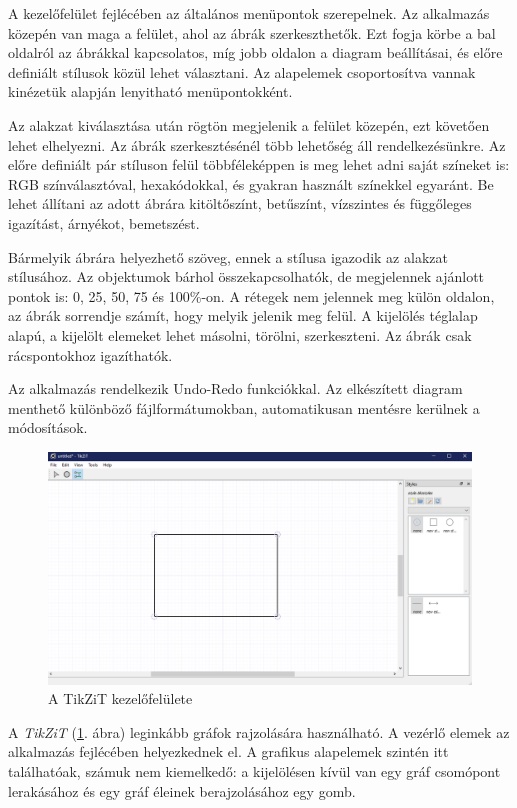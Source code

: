 A kezelőfelület fejlécében az általános menüpontok szerepelnek. Az alkalmazás közepén van maga a felület, ahol az ábrák szerkeszthetők. Ezt fogja körbe a bal oldalról az ábrákkal kapcsolatos, míg jobb oldalon a diagram beállításai, és előre definiált stílusok közül lehet választani. Az alapelemek csoportosítva vannak kinézetük alapján lenyitható menüpontokként. 

Az alakzat kiválasztása után rögtön megjelenik a felület közepén, ezt követően lehet elhelyezni. Az ábrák szerkesztésénél több lehetőség áll rendelkezésünkre. Az előre definiált pár stíluson felül többféleképpen is meg lehet adni saját színeket is: RGB színválasztóval, hexakódokkal, és gyakran használt színekkel egyaránt. Be lehet állítani az adott ábrára kitöltőszínt, betűszínt, vízszintes és függőleges igazítást, árnyékot, bemetszést.

Bármelyik ábrára helyezhető szöveg, ennek a stílusa igazodik az alakzat stílusához. Az objektumok bárhol összekapcsolhatók, de megjelennek ajánlott pontok is: 0, 25, 50, 75 és 100\%-on. A rétegek nem jelennek meg külön oldalon, az ábrák sorrendje számít, hogy melyik jelenik meg felül. A kijelölés téglalap alapú, a kijelölt elemeket lehet másolni, törölni, szerkeszteni. Az ábrák csak rácspontokhoz igazíthatók.

Az alkalmazás rendelkezik Undo-Redo funkciókkal. Az elkészített diagram menthető különböző fájlformátumokban, automatikusan mentésre kerülnek a módosítások. 



\begin{figure}[!h]
	\includegraphics[width=\textwidth]{images/tikzit.png}
	\caption{A TikZiT kezelőfelülete \cite{tikzit}}
	\label{fig:tikzit}
\end{figure}

A \textit{TikZiT} (\ref{fig:tikzit}. ábra) leginkább gráfok rajzolására használható. A vezérlő elemek az alkalmazás fejlécében helyezkednek el. A grafikus alapelemek szintén itt találhatóak, számuk nem kiemelkedő: a kijelölésen kívül van egy gráf csomópont lerakásához és egy gráf éleinek berajzolásához egy gomb. 

